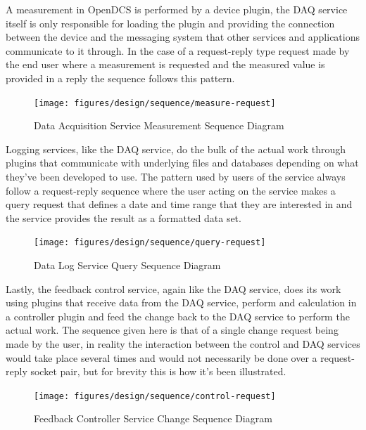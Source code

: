     A measurement in OpenDCS is performed by a device plugin, the DAQ service
    itself is only responsible for loading the plugin and providing the
    connection between the device and the messaging system that other services
    and applications communicate to it through. In the case of a request-reply
    type request made by the end user where a measurement is requested and the
    measured value is provided in a reply the sequence follows this pattern.

    \begin{figure}[H]
      \texttt{[image: figures/design/sequence/measure-request]}
      \caption{Data Acquisition Service Measurement Sequence Diagram}
      \label{fig:dsg-sequence-measure-request}
    \end{figure}

    Logging services, like the DAQ service, do the bulk of the actual work
    through plugins that communicate with underlying files and databases
    depending on what they've been developed to use. The pattern used by users
    of the service always follow a request-reply sequence where the user acting
    on the service makes a query request that defines a date and time range that
    they are interested in and the service provides the result as a formatted
    data set.

    \begin{figure}[H]
      \texttt{[image: figures/design/sequence/query-request]}
      \caption{Data Log Service Query Sequence Diagram}
      \label{fig:dsg-sequence-query-request}
    \end{figure}

    Lastly, the feedback control service, again like the DAQ service, does its
    work using plugins that receive data from the DAQ service, perform and
    calculation in a controller plugin and feed the change back to the DAQ
    service to perform the actual work. The sequence given here is that of a
    single change request being made by the user, in reality the interaction
    between the control and DAQ services would take place several times and
    would not necessarily be done over a request-reply socket pair, but for
    brevity this is how it's been illustrated.

    \begin{figure}[H]
      \texttt{[image: figures/design/sequence/control-request]}
      \caption{Feedback Controller Service Change Sequence Diagram}
      \label{fig:dsg-sequence-control-request}
    \end{figure}

